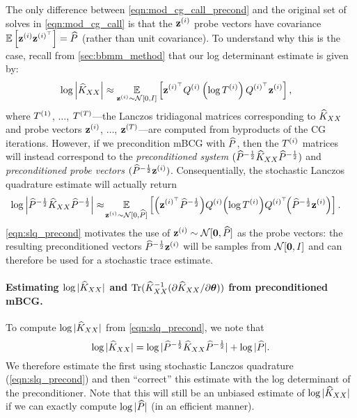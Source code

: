 The only difference between \cref{eqn:mod_cg_call_precond} and the original set of solves in \cref{eqn:mod_cg_call}
is that the $\mathbf{z}^{(i)}$ probe vectors have covariance $\operatorname*{\mathbb{E}} \left[  \mathbf{z}^{(i)} \mathbf{z}^{(i)^\top}  \right] = \widehat{P}$ (rather than unit covariance).
To understand why this is the case, recall from \cref{sec:bbmm_method} that our log determinant estimate is given by:
%
\begin{align*}
	\log \left\vert \trainK \right\vert
	&\approx \Evover{\bz^{(i)} \sim \normaldist{0}{\bI} }{\bz^{(i)^\top} \bQ^{(i)} \left( \log \bT^{(i)} \right) \bQ^{(i)^\top} \bz^{(i)}},
\end{align*}
%
where $T^{(1)}$, $\ldots$, $T^{(T)}$---the Lanczos tridiagonal matrices corresponding to $\widehat{K}_{XX}$ and probe vectors $\mathbf{z}^{(i)}$, $\ldots$, $\mathbf{z}^{(T)}$---are computed from byproducts of the CG iterations.
However, if we precondition mBCG with $\widehat{P}$, then the $T^{(i)}$ matrices will instead correspond to the \emph{preconditioned system}
$(\widehat{P}^{- \frac 1 2} \widehat{K}_{XX} \widehat{P}^{- \frac 1 2})$ and \emph{preconditioned probe vectors} $(\widehat{P}^{- \frac 1 2} \mathbf{z}^{(i)})$.
Consequentially, the stochastic Lanczos quadrature estimate will actually return
%
\begin{align}
	\log \left\vert \trainP^{- \frac 1 2} \trainK \trainP^{- \frac 1 2} \right\vert
	&\approx \!
	\Evover{\bz^{(i)} \sim \normaldist{0}{\trainP} }{
		\left( \bz^{(i)^\top} \trainP^{-\frac 1 2} \right) \!
		\bQ^{(i)} \! \left( \log \bT^{(i)} \right) \! \bQ^{(i)^\top}
		\!\! \left( \trainP^{-\frac 1 2} \bz^{(i)} \right)
	}.
	\label{eqn:slq_precond}
\end{align}
%
\cref{eqn:slq_precond} motivates the use of $\bz^{(i)} \sim \normaldist{\bzero}{\trainP}$ as the probe vectors:
the resulting preconditioned vectors $\widehat{P}^{- \frac 1 2} \mathbf{z}^{(i)}$ will be samples from $\normaldist{\bzero}{\bI}$ and can therefore be used for a stochastic trace estimate.

\paragraph{Estimating $\log \vert \widehat{K}_{XX} \vert$ and $\tr{ \trainK^{-1} (\partial \trainK / \partial \btheta) }$ from preconditioned mBCG.}
To compute $\log \vert \widehat{K}_{XX} \vert$ from \cref{eqn:slq_precond}, we note that
\[
\log \vert \widehat{K}_{XX} \vert = \log \vert \widehat{P}^{- \frac 1 2} \widehat{K}_{XX} \widehat{P}^{- \frac 1 2} \vert + \log \vert \widehat{P} \vert.
\]
We therefore estimate the first using stochastic Lanczos quadrature (\cref{eqn:slq_precond}) and then ``correct'' this estimate with the log determinant of the preconditioner.
Note that this will still be an unbiased estimate of $\log \vert \widehat{K}_{XX} \vert$ if we can exactly compute $\log \vert \widehat{P} \vert$ (in an efficient manner).

